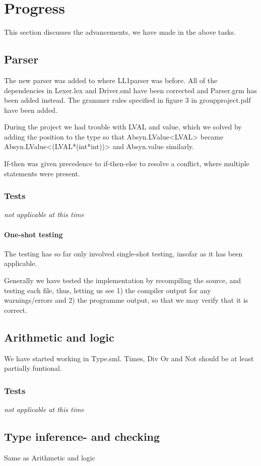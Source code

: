 \documentclass[11pt]{article}
\begin{document}
\section{Progress}
This section discusses the advancements, we have made in the above tasks.

\subsection{Parser}
The new parser was added to where LL1parser was before.
All of the dependencies in Lexer.lex and Driver.sml have been corrected and Parser.grm has been added instead.
The grammer rules specified in figure 3 in groupproject.pdf have been added.

During the project we had trouble with LVAL and value, which we solved by adding the position to the type
so that Absyn.LValue<LVAL> became Absyn.LValue<(LVAL*(int*int))> and Absyn.value similarly.

If-then was given precedence to if-then-else to resolve a conflict, where multiple statements were present.

\subsubsection{Tests}
{\it not applicable at this time}%
\paragraph{One-shot testing}
The testing has so far only involved single-shot testing, insofar as it has
been applicable.

Generally we have tested the implementation by recompiling the source, and
testing each file, thus, letting us see 1) the compiler output for any
warnings/errors and 2) the programme output, so that we may verify that it
is correct.

\subsection{Arithmetic and logic}
We have started working in Type.sml. Times, Div Or and Not should be at least partially funtional.

\subsubsection{Tests}
{\it not applicable at this time}%

\subsection{Type inference- and checking}
Same as Arithmetic and logic
\end{document}
